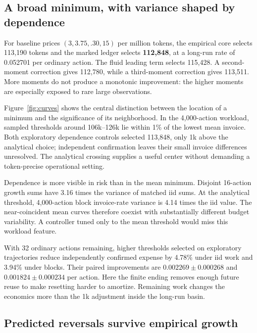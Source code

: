\documentclass[sigconf,screen,nonacm]{acmart}
\begin{document}
\subsection{A broad minimum, with variance shaped by dependence}
\label{sec:baseline}

For baseline prices $(3,3.75,.30,15)$ per million tokens, the empirical core
selects 113,190 tokens and the marked ledger selects \textbf{112,848}, at a
long-run rate of 0.052701 per ordinary action. The fluid leading term selects
115,428. A second-moment correction gives 112,780, while a third-moment
correction gives 113,511. More moments do not produce a monotonic improvement:
the higher moments are especially exposed to rare large observations.



Figure~\ref{fig:curves} shows the central distinction between the location of
a minimum and the significance of its neighborhood. In the 4,000-action
workload, sampled thresholds around 106k--126k lie within 1\% of the lowest
mean invoice. Both exploratory dependence controls selected 113,848, only
1k above the analytical choice; independent confirmation leaves their small
invoice differences unresolved. The analytical crossing supplies a useful
center without demanding a token-precise operational setting.

Dependence is more visible in risk than in the mean minimum. Disjoint
16-action growth sums have 3.16 times the variance of matched iid sums. At the
analytical threshold, 4,000-action block invoice-rate variance is 4.14 times
the iid value. The near-coincident mean curves therefore coexist with
substantially different budget variability. A controller tuned only to the
mean threshold would miss this workload feature.

With 32 ordinary actions remaining, higher thresholds selected on exploratory
trajectories reduce independently confirmed expense by 4.78\% under iid work
and 3.94\% under blocks. Their paired improvements are $0.002269\pm0.000268$
and $0.001824\pm0.000234$ per action. Here the finite ending removes enough
future reuse to make resetting harder to amortize. Remaining work changes the
economics more than the 1k adjustment inside the long-run basin.

\subsection{Predicted reversals survive empirical growth}
\label{sec:reversals}
\end{document}
